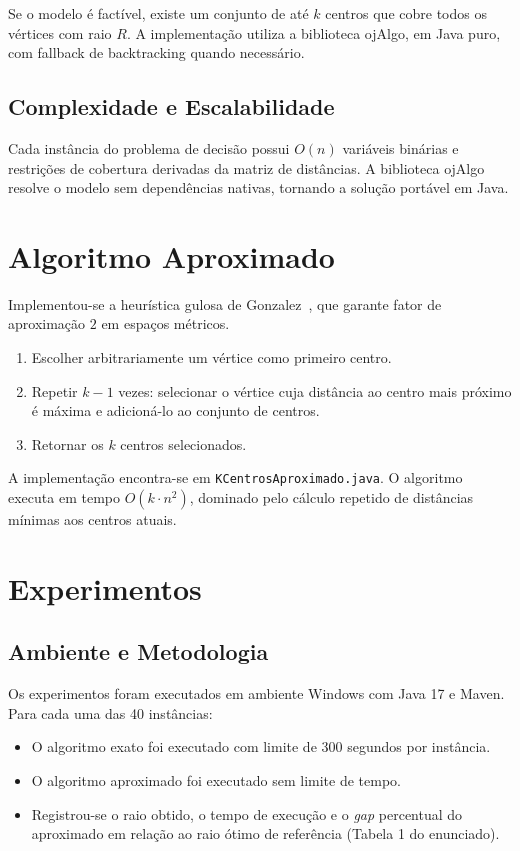 \documentclass[12pt,a4paper]{article}
\begin{document}
Se o modelo é factível, existe um conjunto de até $k$ centros que cobre todos os vértices com raio $R$. A implementação utiliza a biblioteca ojAlgo, em Java puro, com fallback de backtracking quando necessário.

\subsection{Complexidade e Escalabilidade}

Cada instância do problema de decisão possui $O(n)$ variáveis binárias e restrições de cobertura derivadas da matriz de distâncias. A biblioteca ojAlgo resolve o modelo sem dependências nativas, tornando a solução portável em Java.

\section{Algoritmo Aproximado}

Implementou-se a heurística gulosa de Gonzalez~\cite{gonzalez1985}, que garante fator de aproximação $2$ em espaços métricos.

\begin{enumerate}
  \item Escolher arbitrariamente um vértice como primeiro centro.
  \item Repetir $k-1$ vezes: selecionar o vértice cuja distância ao centro mais próximo é máxima e adicioná-lo ao conjunto de centros.
  \item Retornar os $k$ centros selecionados.
\end{enumerate}

A implementação encontra-se em \texttt{KCentrosAproximado.java}. O algoritmo executa em tempo $O(k \cdot n^2)$, dominado pelo cálculo repetido de distâncias mínimas aos centros atuais.

\section{Experimentos}

\subsection{Ambiente e Metodologia}

Os experimentos foram executados em ambiente Windows com Java 17 e Maven. Para cada uma das 40 instâncias:
\begin{itemize}
  \item O algoritmo exato foi executado com limite de 300 segundos por instância.
  \item O algoritmo aproximado foi executado sem limite de tempo.
  \item Registrou-se o raio obtido, o tempo de execução e o \textit{gap} percentual do aproximado em relação ao raio ótimo de referência (Tabela 1 do enunciado).
\end{itemize}
\end{document}
